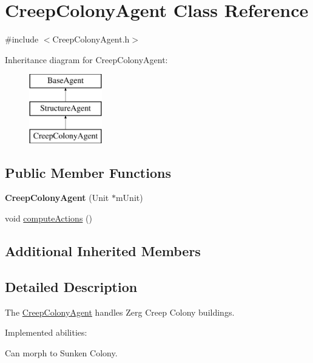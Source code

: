 \hypertarget{class_creep_colony_agent}{\section{Creep\-Colony\-Agent Class Reference}
\label{class_creep_colony_agent}
}


{\ttfamily \#include $<$Creep\-Colony\-Agent.\-h$>$}

Inheritance diagram for Creep\-Colony\-Agent\-:\begin{figure}[H]
\begin{center}
\leavevmode
\includegraphics[height=3.000000cm]{class_creep_colony_agent}
\end{center}
\end{figure}
\subsection*{Public Member Functions}
\begin{DoxyCompactItemize}
\item 
\hypertarget{class_creep_colony_agent_af71ce5af4935d5835189f84d963e2fb3}{{\bfseries Creep\-Colony\-Agent} (Unit $\ast$m\-Unit)}\label{class_creep_colony_agent_af71ce5af4935d5835189f84d963e2fb3}

\item 
void \hyperlink{class_creep_colony_agent_acfbc5efe21ff77216eb2e209797deb4f}{compute\-Actions} ()
\end{DoxyCompactItemize}
\subsection*{Additional Inherited Members}


\subsection{Detailed Description}
The \hyperlink{class_creep_colony_agent}{Creep\-Colony\-Agent} handles Zerg Creep Colony buildings.

Implemented abilities\-:
\begin{DoxyItemize}
\item Can morph to Sunken Colony.
\end{DoxyItemize}

